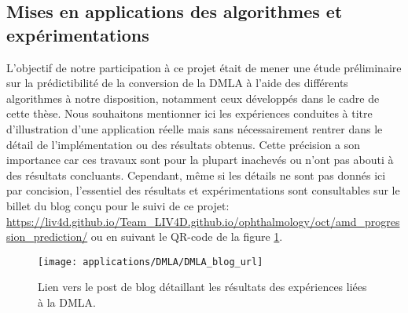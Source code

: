 \subsection{Mises en applications des algorithmes et expérimentations}
L'objectif de notre participation à ce projet était de mener une étude préliminaire sur la prédictibilité de la conversion de la DMLA à l'aide des différents algorithmes à notre disposition, notamment ceux développés dans le cadre de cette thèse. Nous souhaitons mentionner ici les expériences conduites à titre d'illustration d'une application réelle mais sans nécessairement rentrer dans le détail de l'implémentation ou des résultats obtenus. Cette précision a son importance car ces travaux sont pour la plupart inachevés ou n'ont pas abouti à des résultats concluants. Cependant, même si les détails ne sont pas donnés ici par concision, l'essentiel des résultats et expérimentations sont consultables sur le billet du blog conçu pour le suivi de ce projet: \url{https://liv4d.github.io/Team_LIV4D.github.io/ophthalmology/oct/amd_progression_prediction/} ou en suivant le QR-code de la figure \ref{fig:blogpost_QRcode}.
\begin{figure}[H]
	\centering
	\texttt{[image: applications/DMLA/DMLA\_blog\_url]}
	\caption{Lien vers le post de blog détaillant les résultats des expériences liées à la DMLA.}
	\label{fig:blogpost_QRcode}
	
\end{figure}

